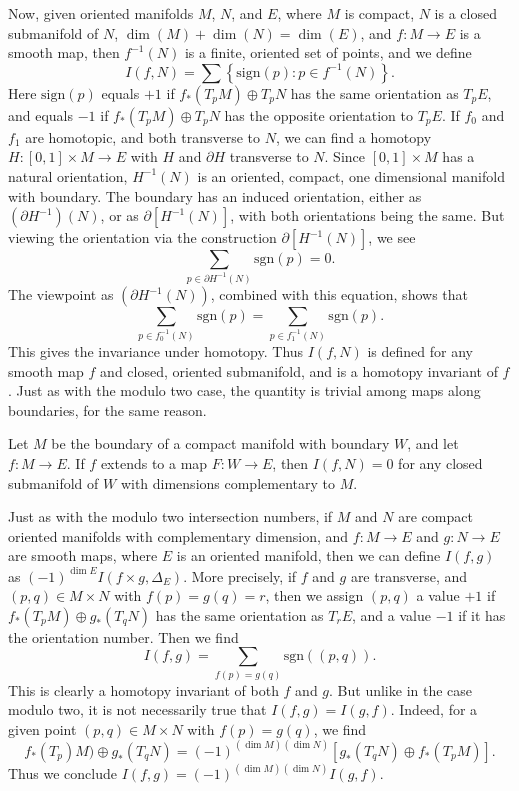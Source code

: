 Now, given oriented manifolds $M$, $N$, and $E$, where $M$ is compact, $N$ is a closed submanifold of $N$, $\dim(M) + \dim(N) = \dim(E)$, and $f: M \to E$ is a smooth map, then $f^{-1}(N)$ is a finite, oriented set of points, and we define
%
\[ I(f,N) = \sum \left\{ \text{sign}(p) : p \in f^{-1}(N) \right\}. \]
%
Here $\text{sign}(p)$ equals $+1$ if $f_*(T_p M) \oplus T_p N$ has the same orientation as $T_p E$, and equals $-1$ if $f_*(T_p M) \oplus T_p N$ has the opposite orientation to $T_p E$. If $f_0$ and $f_1$ are homotopic, and both transverse to $N$, we can find a homotopy $H: [0,1] \times M \to E$ with $H$ and $\partial H$ transverse to $N$. Since $[0,1] \times M$ has a natural orientation, $H^{-1}(N)$ is an oriented, compact, one dimensional manifold with boundary. The boundary has an induced orientation, either as $(\partial H^{-1})(N)$, or as $\partial [H^{-1}(N)]$, with both orientations being the same. But viewing the orientation via the construction $\partial [H^{-1}(N)]$, we see
%
\[ \sum_{p \in \partial H^{-1}(N)} \text{sgn}(p) = 0. \]
%
The viewpoint as $(\partial H^{-1}(N))$, combined with this equation, shows that
%
\[ \sum_{p \in f_0^{-1}(N)} \text{sgn}(p) = \sum_{p \in f_1^{-1}(N)} \text{sgn}(p). \]
%
This gives the invariance under homotopy. Thus $I(f,N)$ is defined for any smooth map $f$ and closed, oriented submanifold, and is a homotopy invariant of $f$. Just as with the modulo two case, the quantity is trivial among maps along boundaries, for the same reason.

\begin{theorem}
    Let $M$ be the boundary of a compact manifold with boundary $W$, and let $f: M \to E$. If $f$ extends to a map $F: W \to E$, then $I(f,N) = 0$ for any closed submanifold of $W$ with dimensions complementary to $M$.
\end{theorem}

Just as with the modulo two intersection numbers, if $M$ and $N$ are compact oriented manifolds with complementary dimension, and $f: M \to E$ and $g: N \to E$ are smooth maps, where $E$ is an oriented manifold, then we can define $I(f,g)$ as $(-1)^{\dim E} I(f \times g, \Delta_E)$. More precisely, if $f$ and $g$ are transverse, and $(p,q) \in M \times N$ with $f(p) = g(q) = r$, then we assign $(p,q)$ a value $+1$ if $f_*(T_p M) \oplus g_*(T_q N)$ has the same orientation as $T_r E$, and a value $-1$ if it has the orientation number. Then we find
%
\[ I(f,g) = \sum_{f(p) = g(q)} \text{sgn}((p,q)). \]
%
This is clearly a homotopy invariant of both $f$ and $g$. But unlike in the case modulo two, it is not necessarily true that $I(f,g) = I(g,f)$. Indeed, for a given point $(p,q) \in M \times N$ with $f(p) = g(q)$, we find
%
\[ f_*(T_p) M) \oplus g_*(T_q N) = (-1)^{(\dim M)(\dim N)} [g_*(T_q N) \oplus f_*(T_p M)]. \]
%
Thus we conclude $I(f,g) = (-1)^{(\dim M)(\dim N)} I(g,f)$.

